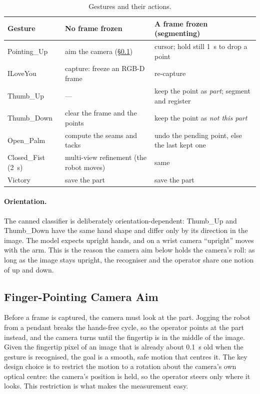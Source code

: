 \begin{table}[htbp]
\caption{Gestures and their actions.}
\label{tab:gestures}
\centering\small
\begin{tabular}{@{}L{0.20\textwidth}L{0.36\textwidth}L{0.36\textwidth}@{}}
\toprule
Gesture & No frame frozen & A frame frozen (segmenting) \\
\midrule
Pointing\_Up & aim the camera (\S\ref{sec:mc_aim}) & cursor; hold still 1~s to drop a point \\
ILoveYou & capture: freeze an RGB-D frame & re-capture \\
Thumb\_Up & --- & keep the point as \emph{part}; segment and register \\
Thumb\_Down & clear the frame and the points & keep the point as \emph{not this part} \\
Open\_Palm & compute the seams and tacks & undo the pending point, else the last kept one \\
Closed\_Fist (2~s) & multi-view refinement (the robot moves) & same \\
Victory & save the part & save the part \\
\bottomrule
\end{tabular}
\end{table}

\paragraph{Orientation.} The canned classifier is deliberately orientation-dependent: Thumb\_Up
and Thumb\_Down have the same hand shape and differ only by its direction in the image. The model
expects upright hands, and on a wrist camera ``upright'' moves with the arm. This is the reason
the camera aim below holds the camera's roll: as long as the image stays upright, the recogniser
and the operator share one notion of up and down.

\subsection{Finger-Pointing Camera Aim}
\label{sec:mc_aim}
Before a frame is captured, the camera must look at the part. Jogging the robot from a pendant
breaks the hands-free cycle, so the operator points at the part instead, and the camera turns
until the fingertip is in the middle of the image. Given the fingertip pixel of an image that is
already about 0.1~s old when the gesture is recognised, the goal is a smooth, safe motion that
centres it. The key design choice is to restrict the motion to a rotation about the camera's own
optical centre: the camera's position is held, so the operator steers only where it looks. This
restriction is what makes the measurement easy.

